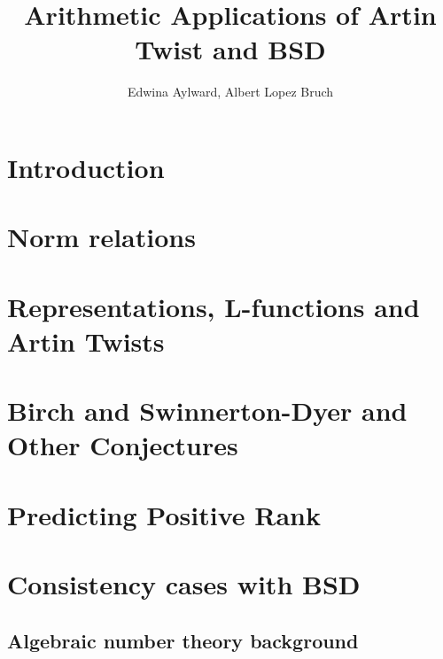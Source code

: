 \documentclass{article}
\title{Arithmetic Applications of Artin Twist and BSD}
\author{Edwina Aylward, Albert Lopez Bruch}
\theoremstyle{plain}
\theoremstyle{definition}
\begin{document}
	\maketitle
	\newpage
	\tableofcontents
	\newpage

\section*{Introduction}


\newpage
\section{Norm relations}



\newpage
\section{Representations, L-functions and Artin Twists}


\section{Birch and Swinnerton-Dyer and Other Conjectures}


\section{Predicting Positive Rank}


%
%


\newpage
\section{Consistency cases with BSD}



\begin{appendices}
\section{Algebraic number theory background}
%

\end{appendices}

\newpage



\end{document}
